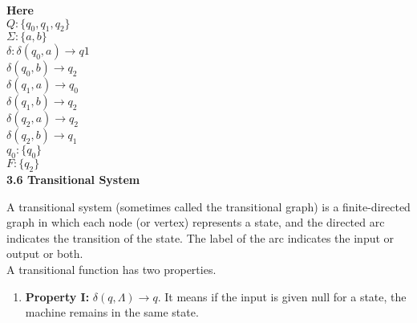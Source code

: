 \documentclass{article}
\begin{document}
\vspace*{0.2cm}
\textbf{Here}\\
\hspace*{1.5cm} $Q : \{q_{0}, q_{1}, q_{2}\}$ \\
\hspace*{1.5cm} $\Sigma : \{a, b\}$ \\
\hspace*{1.5cm} $\delta : \delta(q_{0}, a) \rightarrow q1$ \\
\hspace*{2cm} $\delta(q_{0}, b) \rightarrow q_{2}$ \\
\hspace*{2cm} $\delta(q_{1}, a) \rightarrow q_{0}$ \\
\hspace*{2cm} $\delta(q_{1}, b) \rightarrow q_{2}$ \\
\hspace*{2cm} $\delta(q_{2}, a) \rightarrow q_{2}$ \\
\hspace*{2cm} $\delta(q_{2}, b) \rightarrow q_{1}$ \\
\hspace*{1.5cm} $q_{0} : \{q_{0}\}$ \\
\hspace*{1.5cm} $F : \{q_{2}\}$ \\

\vspace*{0.1cm}
\large{
\textbf{3.6 Transitional System}\\
}

\vspace*{0.2cm}

A transitional system (sometimes called the transitional graph) is a finite-directed graph in which each
node (or vertex) represents a state, and the directed arc indicates the transition of the state. The label of
the arc indicates the input or output or both.\\
\hspace*{0.5cm} A transitional function has two properties.\\

\vspace*{0.1cm}
\begin{enumerate}
  \item \textbf{Property I:} $\delta(q, \Lambda) \rightarrow q.$ It means if the input is given null for a state, the machine remains in the
same state.\\
\end{enumerate}
\end{document}
